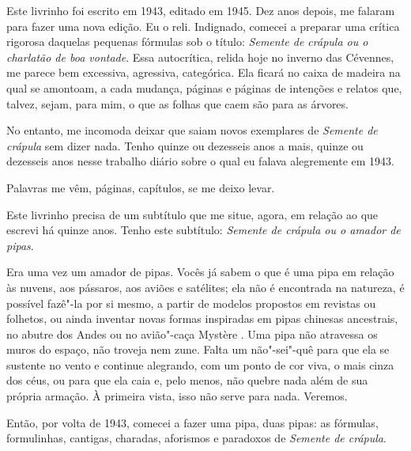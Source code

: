 \pagebreak
\thispagestyle{empty}
\movetooddpage
\thispagestyle{empty}
\begin{vplace}[0.25]


{\large{}}
\end{vplace}

\pagebreak
\thispagestyle{empty}

\movetooddpage

Este livrinho foi escrito em 1943, editado em 1945. Dez anos depois, me
falaram para fazer uma nova edição. Eu o reli. Indignado, comecei a
preparar uma crítica rigorosa daquelas pequenas fórmulas sob o título:
\emph{Semente de crápula ou o charlatão de boa vontade}. Essa
autocrítica, relida hoje no inverno das Cévennes, me parece bem
excessiva, agressiva, categórica. Ela ficará no caixa de madeira na
qual se amontoam, a cada mudança, páginas e páginas de intenções e
relatos que, talvez, sejam, para mim, o que as folhas que caem são para as
árvores.

No entanto, me incomoda deixar que saiam novos exemplares de
\emph{Semente de crápula} sem dizer nada. Tenho quinze ou dezesseis anos
a mais, quinze ou dezesseis anos nesse trabalho diário sobre o qual eu falava
alegremente em 1943.

Palavras me vêm, páginas, capítulos, se me deixo levar.

Este livrinho precisa de um subtítulo que me situe, agora, em relação ao
que escrevi há quinze anos. Tenho este subtítulo: \emph{Semente de
crápula ou o amador de pipas}.

Era uma vez um amador de pipas. Vocês já sabem o que é uma pipa em
relação às nuvens, aos pássaros, aos aviões e satélites; ela não é
encontrada na natureza, é possível fazê"-la por si mesmo, a partir de
modelos propostos em revistas ou folhetos, ou ainda inventar novas
formas inspiradas em pipas chinesas ancestrais, no abutre dos Andes ou
no avião"-caça Mystère . Uma pipa não atravessa os muros do espaço, não
troveja nem zune. Falta um não"-sei"-quê para que ela se sustente no vento
e continue alegrando, com um ponto de cor viva, o mais cinza dos céus,
ou para que ela caia e, pelo menos, não quebre nada além de sua própria
armação. À primeira vista, isso não serve para nada. Veremos.

Então, por volta de 1943, comecei a fazer uma pipa, duas pipas: as
fórmulas, formulinhas, cantigas, charadas, aforismos e paradoxos de
\emph{Semente de crápula}.

